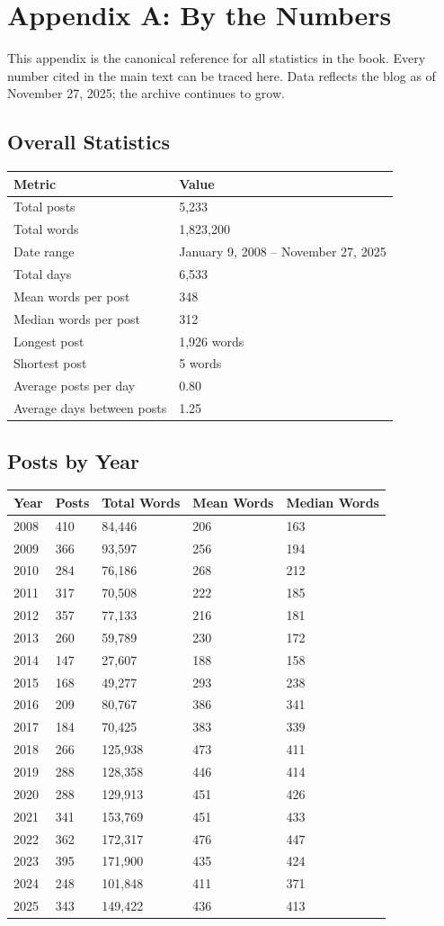 \chapter{Appendix A: By the Numbers}

This appendix is the canonical reference for all statistics in the book. Every number cited in the main text can be traced here. Data reflects the blog as of November 27, 2025; the archive continues to grow.

\bigskip

\section*{Overall Statistics}

\begin{longtable}{l p{5.5cm}}
\toprule
\textbf{Metric} & \textbf{Value} \tabularnewline
\midrule
Total posts & 5,233 \tabularnewline
Total words & 1,823,200 \tabularnewline
Date range & January 9, 2008 – November 27, 2025 \tabularnewline
Total days & 6,533 \tabularnewline
Mean words per post & 348 \tabularnewline
Median words per post & 312 \tabularnewline
Longest post & 1,926 words \tabularnewline
Shortest post & 5 words \tabularnewline
Average posts per day & 0.80 \tabularnewline
Average days between posts & 1.25 \tabularnewline
\bottomrule
\end{longtable}

\bigskip

\section*{Posts by Year}

\begin{longtable}{p{1.80cm}p{1.80cm}p{1.80cm}p{1.80cm}p{1.80cm}}
\toprule
\textbf{Year} & \textbf{Posts} & \textbf{Total Words} & \textbf{Mean Words} & \textbf{Median Words} \tabularnewline
\midrule
2008 & 410 & 84,446 & 206 & 163 \tabularnewline
2009 & 366 & 93,597 & 256 & 194 \tabularnewline
2010 & 284 & 76,186 & 268 & 212 \tabularnewline
2011 & 317 & 70,508 & 222 & 185 \tabularnewline
2012 & 357 & 77,133 & 216 & 181 \tabularnewline
2013 & 260 & 59,789 & 230 & 172 \tabularnewline
2014 & 147 & 27,607 & 188 & 158 \tabularnewline
2015 & 168 & 49,277 & 293 & 238 \tabularnewline
2016 & 209 & 80,767 & 386 & 341 \tabularnewline
2017 & 184 & 70,425 & 383 & 339 \tabularnewline
2018 & 266 & 125,938 & 473 & 411 \tabularnewline
2019 & 288 & 128,358 & 446 & 414 \tabularnewline
2020 & 288 & 129,913 & 451 & 426 \tabularnewline
2021 & 341 & 153,769 & 451 & 433 \tabularnewline
2022 & 362 & 172,317 & 476 & 447 \tabularnewline
2023 & 395 & 171,900 & 435 & 424 \tabularnewline
2024 & 248 & 101,848 & 411 & 371 \tabularnewline
2025 & 343 & 149,422 & 436 & 413 \tabularnewline
\bottomrule
\end{longtable}

